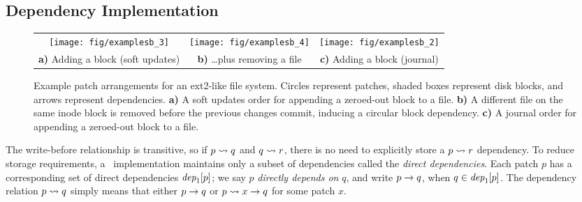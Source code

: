 \subsection{Dependency Implementation}



\begin{figure*}[t]
\centering
\begin{tabular}{@{}cc@{\qquad\qquad}c@{}}
\texttt{[image: fig/examplesb\_3]}
& \texttt{[image: fig/examplesb\_4]}
& \texttt{[image: fig/examplesb\_2]} \\
\textbf{a)} Adding a block (soft updates)
& \textbf{b)} \dots plus removing a file
& \textbf{c)} Adding a block (journal) \\
\end{tabular}
\caption{Example patch arrangements for an ext2-like file system.
 Circles represent patches, shaded boxes represent disk blocks, and arrows
 represent dependencies.
 \textbf{a)} A soft updates order for appending a zeroed-out block to
 a file.  \textbf{b)} A different file on the same inode block is removed
 before the previous changes commit, inducing a circular block dependency.
 \textbf{c)} A journal order for appending a zeroed-out block to a
 file.}
\label{f:ex}
\end{figure*}


The write-before relationship is transitive, so if $p \leadsto q$ and $q
 \leadsto r$, there is no need to explicitly store a $p \leadsto r$
 dependency.
%
To reduce storage requirements, a \Kudos\ implementation maintains only a
 subset of dependencies called the \emph{direct dependencies}.
%
Each patch $p$ has a corresponding set of direct dependencies
 $\textit{dep}_1[p]$; 
%
we say $p$ \emph{directly depends on} $q$, and write $p \rightarrow q$, when
 $q \in \textit{dep}_1[p]$.
%
The dependency relation $p \leadsto q$ simply means that either $p
 \rightarrow q$ or $p \leadsto x \rightarrow q$ for some patch $x$.


\begin{comment}
\paragraph{Undo data}
%
When a \patch\ is created, the buffer cache's copy of the block data
is modified in-place to reflect the change. However,
%
some arrangements of \patches\ may require that the buffer cache
first write a block with only some \patches\ applied, and then write a
different block before being able to write the remaining \patches.
%
(An example of this is given in Section~\ref{sec:patch:examples}.)
\end{comment}



